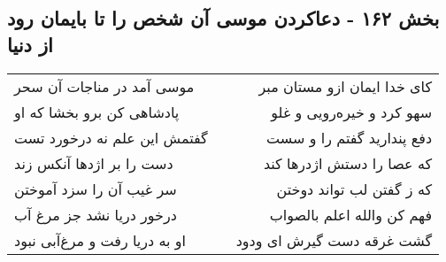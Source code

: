 \begin{center}
\section*{بخش ۱۶۲ - دعاکردن موسی آن شخص را تا بایمان رود از دنیا}
\label{sec:sh162}
\begin{longtable}{l p{0.5cm} r}
موسی آمد در مناجات آن سحر
&&
کای خدا ایمان ازو مستان مبر
\\
پادشاهی کن برو بخشا که او
&&
سهو کرد و خیره‌رویی و غلو
\\
گفتمش این علم نه درخورد تست
&&
دفع پندارید گفتم را و سست
\\
دست را بر اژدها آنکس زند
&&
که عصا را دستش اژدرها کند
\\
سر غیب آن را سزد آموختن
&&
که ز گفتن لب تواند دوختن
\\
درخور دریا نشد جز مرغ آب
&&
فهم کن والله اعلم بالصواب
\\
او به دریا رفت و مرغ‌آبی نبود
&&
گشت غرقه دست گیرش ای ودود
\\
\end{longtable}
\end{center}
